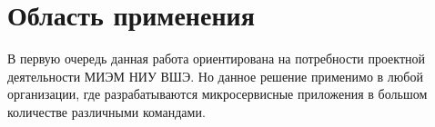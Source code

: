 \section{Область применения}
\label{sec:appl-area}

В первую очередь данная работа ориентирована на потребности проектной деятельности МИЭМ НИУ ВШЭ. Но данное решение применимо в любой организации, где разрабатываются микросервисные приложения в большом количестве различными командами.
